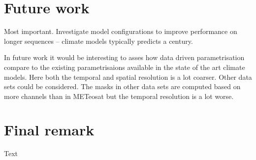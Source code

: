 \section{Future work}

Most important. Investigate model configurations to improve performance on longer sequences -- climate models typically predicts a century.

In future work it would be interesting to asses how data driven parametrisation compare to the existing parametrisaions available in the state of the art climate models. Here both the temporal and spatial resolution is a lot coarser. Other data sets could be considered. The masks in other data sets are computed based on more channels than in METeosat but the temporal resolution is a lot worse. 



\section{Final remark}
Text